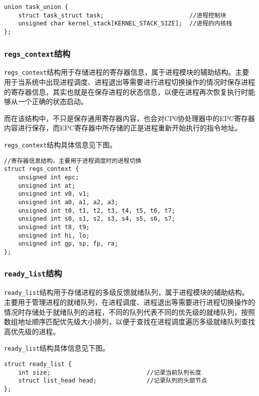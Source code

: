 \begin{lstlisting}[caption=\texttt{task\_union}数据结构]
union task_union {
    struct task_struct task;                        //进程控制块
    unsigned char kernel_stack[KERNEL_STACK_SIZE];  //进程的内核栈
};
\end{lstlisting}

\subsubsection{\texttt{regs\_context}结构}

\texttt{regs\_context}结构用于存储进程的寄存器信息，属于进程模块的辅助结构。主要用于当系统中出现进程调度、进程退出等需要进行进程切换操作的情况时保存进程的寄存器信息，其实也就是在保存进程的状态信息，以便在进程再次恢复执行时能够从一个正确的状态启动。

而在该结构中，不只是保存通用寄存器内容，也会对CP0协处理器中的EPC寄存器内容进行保存，而EPC寄存器中所存储的正是进程重新开始执行的指令地址。

\texttt{regs\_context}结构具体信息见下图。

\begin{lstlisting}[caption=\texttt{regs\_context}结构]
//寄存器信息结构，主要用于进程调度时的进程切换
struct regs_context {
    unsigned int epc;
    unsigned int at;
    unsigned int v0, v1;
    unsigned int a0, a1, a2, a3;
    unsigned int t0, t1, t2, t3, t4, t5, t6, t7;
    unsigned int s0, s1, s2, s3, s4, s5, s6, s7;
    unsigned int t8, t9;
    unsigned int hi, lo;
    unsigned int gp, sp, fp, ra;
};
\end{lstlisting}

\subsubsection{\texttt{ready\_list}结构}

\texttt{ready\_list}结构用于存储进程的多级反馈就绪队列，属于进程模块的辅助结构。主要用于管理进程的就绪队列，在进程调度、进程退出等需要进行进程切换操作的情况时存储处于就绪队列的进程，不同的队列代表不同的优先级的就绪队列，按照数组地址顺序匹配优先级大小排列，以便于查找在进程调度遍历多级就绪队列查找高优先级的进程。

\texttt{ready\_list}结构具体信息见下图。

\begin{lstlisting}[caption=\texttt{ready\_list}结构]
struct ready_list {
    int size;                           //记录当前队列长度
    struct list_head head;              //记录队列的头部节点
};
\end{lstlisting}

